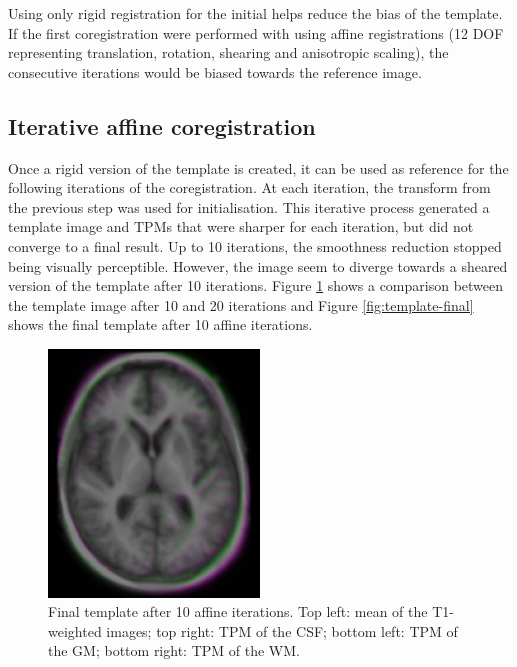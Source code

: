 Using only rigid registration for the initial helps reduce the bias of the template. If the first coregistration were performed with using affine registrations (12 DOF representing translation, rotation, shearing and anisotropic scaling), the consecutive iterations would be biased towards the reference image.


\subsection{Iterative affine coregistration}
Once a rigid version of the template is created, it can be used as reference for the following iterations of the coregistration. At each iteration, the transform from the previous step was used for initialisation. This iterative process generated a template image and TPMs that were sharper for each iteration, but did not converge to a final result. Up to 10 iterations, the smoothness reduction stopped being visually perceptible. However, the image seem to diverge towards a sheared version of the template after 10 iterations. Figure \ref{fig:template-sheared} shows a comparison between the template image after 10 and 20 iterations and Figure \ref{fig:template-final} shows the final template after 10 affine iterations.


\begin{figure}
  \includegraphics[width=0.5\textwidth]{figures/template_sheared}
  \centering
  \caption{Final template after 10 affine iterations. Top left: mean of the T1-weighted images; top right: TPM of the CSF; bottom left: TPM of the GM; bottom right: TPM of the WM.}
  \label{fig:template-sheared}
\end{figure}


